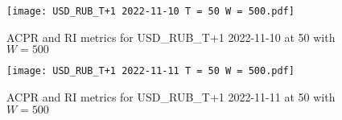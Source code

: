 \begin{figure}[htbp]
	\texttt{[image: USD\_RUB\_T+1 2022-11-10 T = 50 W = 500.pdf]}
	\caption{ACPR and RI metrics for USD\_RUB\_T+1 2022-11-10 at 50 with $W = 500$}
\end{figure}

\begin{figure}[htbp]
	\texttt{[image: USD\_RUB\_T+1 2022-11-11 T = 50 W = 500.pdf]}
	\caption{ACPR and RI metrics for USD\_RUB\_T+1 2022-11-11 at 50 with $W = 500$}
\end{figure}

